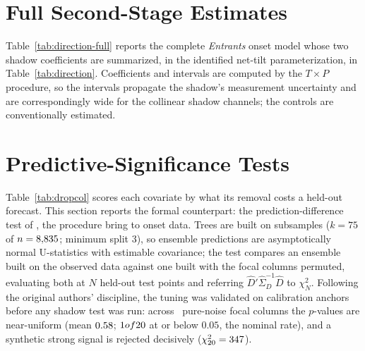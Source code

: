 \section{Full Second-Stage Estimates}
\label{app:full-model}

Table~\ref{tab:direction-full} reports the complete \textit{Entrants} onset
model whose two shadow coefficients are summarized, in the identified
net-tilt parameterization, in Table~\ref{tab:direction}.  Coefficients and
intervals are computed by the $T \times P$ procedure, so the intervals
propagate the shadow's measurement uncertainty and are correspondingly wide
for the collinear shadow channels; the controls are conventionally estimated.



\section{Predictive-Significance Tests}
\label{app:pstests}

Table~\ref{tab:dropcol} scores each covariate by what its removal costs a
held-out forecast.  This section reports the formal counterpart: the
prediction-difference test of \citet{mentchhooker2016}, the procedure
\citet{mcalexandermentch2020} bring to onset data.  Trees are built on
subsamples ($k = 75$ of $n = 8{,}835$; minimum split 3), so ensemble
predictions are asymptotically normal U-statistics with estimable covariance;
the test compares an ensemble built on the observed data against one built
with the focal columns permuted, evaluating both at $N$ held-out test points
and referring $\hat{D}' \hat{\Sigma}_D^{-1} \hat{D}$ to $\chi^2_N$.
Following the original authors' discipline, the tuning was validated on
calibration anchors before any shadow test was run: across \MhNoiseReps\
pure-noise focal columns the $p$-values are near-uniform (mean
$0.58$; $1 of 20$ at or below $0.05$, the nominal rate), and a
synthetic strong signal is rejected decisively
($\chi^2_{20} = 347$).

